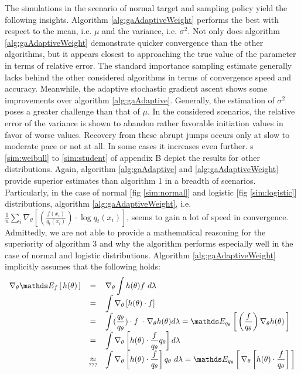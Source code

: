 The simulations in the scenario of normal target and sampling policy yield the following insights.
Algorithm \ref{alg:gaAdaptiveWeight} performs the best with respect to the mean, i.e. $\mu$ and the variance, i.e. $\sigma^2$. Not only does algorithm \ref{alg:gaAdaptiveWeight} demonstrate quicker convergence than the other algorithms, but it appears closest to approaching the true value of the parameter in terms of relative error. The standard importance sampling estimate generally lacks behind the other considered algorithms in terms of convergence speed and accuracy. Meanwhile, the adaptive stochastic gradient ascent shows some improvements over algorithm \ref{alg:gaAdaptive}. Generally, the estimation of $\sigma^2$ poses a greater challenge than that of $\mu$. In the considered scenarios, the relative error of the variance is shown to abandon rather favorable initiation values in favor of worse values. Recovery from these abrupt jumps occurs only at slow to moderate pace or not at all. In some cases it increases even further. 
s \ref{sim:weibull} to \ref{sim:student} of appendix B depict the results for other distributions. Again, algorithm \ref{alg:gaAdaptive} and \ref{alg:gaAdaptiveWeight} provide superior estimates than algorithm 1 in a breadth of scenarios.
Particularly, in the case of normal [fig \ref{sim:normal}] and logistic [fig \ref{sim:logistic}] distributions, algorithm \ref{alg:gaAdaptiveWeight}, i.e. $\displaystyle{\frac 1 n \sum\limits_i \nabla_\theta \left[ \left( \frac{f(x_i)}{q_t(x_i)}\right) \cdot \log q_t(x_i) \right]}$, seems to gain a lot of speed in convergence.
Admittedly, we are not able to provide a mathematical reasoning for the superiority of algorithm 3 and why the algorithm performs especially well in the case of normal and logistic distributions.
Algorithm \ref{alg:gaAdaptiveWeight} implicitly assumes that the following holds: 
$$\begin{array}{rcl}
    \nabla_\theta \esperanceloi{f}{h(\theta)}
    &=& \nabla_\theta \displaystyle\int h(\theta) f \ d\lambda \\
    &=& \displaystyle\int \nabla_\theta\left[ h(\theta) \cdot f \right] \\
    &=& \displaystyle\int (\frac{q_\theta}{q_\theta}) \cdot f \ \cdot \nabla_\theta h(\theta) d\lambda 
    = \esperanceloi{q_\theta}{\left( \frac{f}{q_\theta} \right) \nabla_\theta h(\theta)}
    \\
    &=& \displaystyle\int \nabla_\theta\left[ h(\theta) \cdot \frac f {q_\theta} q_\theta \right] d \lambda
    \\
    &\underset{???}{\approx}& \displaystyle\int \nabla_\theta\left[ h(\theta) \cdot \frac f {q_\theta}  \right] q_\theta \ d \lambda = \esperanceloi{q_\theta}{\nabla_\theta\left[ h(\theta) \cdot \frac f {q_\theta}  \right]}
\end{array}
$$

